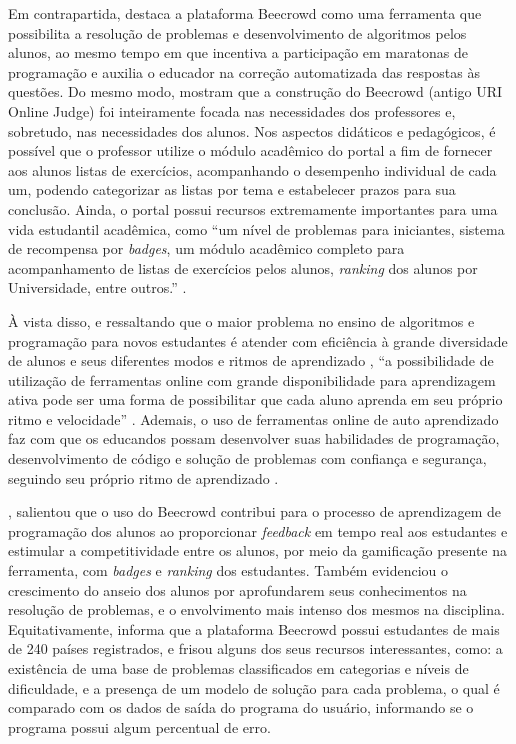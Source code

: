Em contrapartida, \textcite[p.~5]{cruz2022} destaca a plataforma Beecrowd como uma ferramenta que possibilita a resolução de problemas e desenvolvimento de algoritmos pelos alunos, ao mesmo tempo em que incentiva a participação em maratonas de programação e auxilia o educador na correção automatizada das respostas às questões. Do mesmo modo, \textcite[p.~239]{beztonin2014} mostram que a construção do Beecrowd (antigo URI Online Judge) foi inteiramente focada nas necessidades dos professores e, sobretudo, nas necessidades dos alunos. Nos aspectos didáticos e pedagógicos, é possível que o professor utilize o módulo acadêmico do portal a fim de fornecer aos alunos listas de exercícios, acompanhando o desempenho individual de cada um, podendo categorizar as listas por tema e estabelecer prazos para sua conclusão. Ainda, o portal possui recursos extremamente importantes para uma vida estudantil acadêmica, como “um nível de  problemas  para  iniciantes,  sistema  de  recompensa  por \textit{badges},  um  módulo  acadêmico completo  para  acompanhamento  de  listas  de  exercícios  pelos  alunos,  \textit{ranking}  dos  alunos  por Universidade, entre outros.” \cite[p.~239]{beztonin2014}. 

À vista disso, e ressaltando que o maior problema no ensino de algoritmos e programação para novos estudantes é atender com eficiência à grande diversidade de alunos e seus diferentes modos e ritmos de aprendizado \cite[p.~1]{beztonin2012}, “a possibilidade de utilização de ferramentas online com grande disponibilidade para aprendizagem ativa pode ser uma forma de possibilitar que cada aluno aprenda em seu próprio ritmo e velocidade” \cite[p.~5]{cruz2022}. Ademais, o uso de ferramentas online de auto aprendizado faz com que os educandos possam desenvolver suas habilidades de programação, desenvolvimento de código e solução de problemas com confiança e segurança, seguindo seu próprio ritmo de aprendizado \cite[p.~239-240]{beztonin2014}. 

\textcite[p.~248]{berssanettefrancisco}, salientou que o uso do Beecrowd contribui para o processo de aprendizagem de programação dos alunos ao proporcionar \textit{feedback} em tempo real aos estudantes e estimular a competitividade entre os alunos, por meio da gamificação presente na ferramenta, com \textit{badges} e \textit{ranking} dos estudantes. Também evidenciou o crescimento do anseio dos alunos por aprofundarem seus conhecimentos na resolução de problemas, e o envolvimento mais intenso dos mesmos na disciplina. Equitativamente, \textcite[p.~31]{ferreira2022} informa que a plataforma Beecrowd possui estudantes de mais de 240 países registrados, e frisou alguns dos seus recursos interessantes, como: a existência de uma base de problemas classificados em categorias e níveis de dificuldade, e a presença de um modelo de solução para cada problema, o qual é comparado com os dados de saída do programa do usuário, informando se o programa possui algum percentual de erro. 


